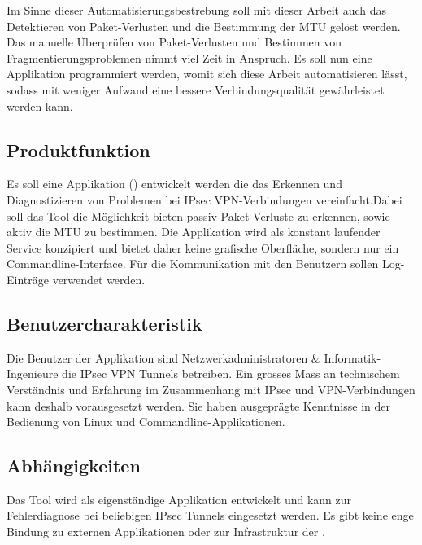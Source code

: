 Im Sinne dieser Automatisierungsbestrebung soll mit dieser Arbeit auch das Detektieren von Paket-Verlusten und die Bestimmung der \ac{MTU} gelöst werden.
Das manuelle Überprüfen von Paket-Verlusten und Bestimmen von Fragmentierungsproblemen nimmt viel Zeit in Anspruch. Es soll nun eine Applikation programmiert werden, womit sich diese Arbeit automatisieren lässt, sodass mit weniger Aufwand eine bessere Verbindungsqualität gewährleistet werden kann.


\subsection{Produktfunktion}
Es soll eine Applikation (\tool{}) entwickelt werden die das Erkennen und Diagnostizieren von Problemen bei \ac{IPsec} \ac{VPN}-Verbindungen vereinfacht.Dabei soll das Tool die Möglichkeit bieten passiv Paket-Verluste zu erkennen, sowie aktiv die \ac{MTU} zu bestimmen. Die Applikation wird als konstant laufender Service konzipiert und bietet daher keine grafische Oberfläche, sondern nur ein Commandline-Interface. Für die Kommunikation mit den Benutzern sollen Log-Einträge verwendet werden.

\subsection{Benutzercharakteristik}
Die Benutzer der Applikation sind Netzwerkadministratoren \& Informatik-Ingenieure die \ac{IPsec} \ac{VPN} Tunnels betreiben. Ein grosses Mass an technischem Verständnis und Erfahrung im Zusammenhang mit \ac{IPsec} und \ac{VPN}-Verbindungen kann deshalb vorausgesetzt werden. Sie haben ausgeprägte Kenntnisse in der Bedienung von Linux und Commandline-Applikationen.

\subsection{Abhängigkeiten}
Das Tool wird als eigenständige Applikation entwickelt und kann zur Fehlerdiagnose bei beliebigen \ac{IPsec} Tunnels eingesetzt werden. Es gibt keine enge Bindung zu externen Applikationen oder zur Infrastruktur der \osag{}.